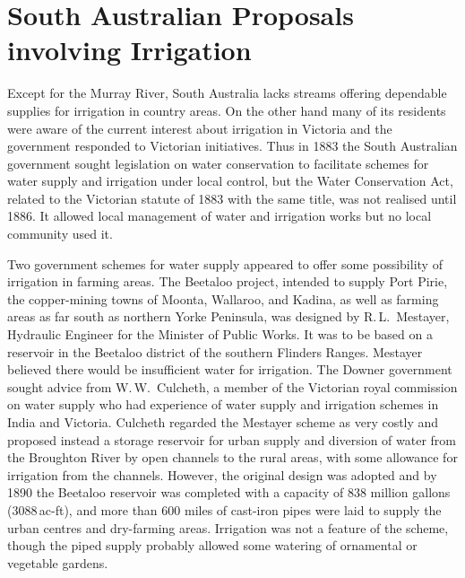 \section*{South Australian Proposals involving Irrigation}

Except for the Murray River, South Australia lacks streams offering
dependable supplies for irrigation in country areas.  On the other
hand many of its residents were aware of the current interest about
irrigation in Victoria and the government responded to Victorian
initiatives.  Thus in 1883 the South Australian government sought
legislation on water conservation to facilitate schemes for water
supply and irrigation under local control, but the Water Conservation
Act,  related to the Victorian
statute of 1883 with the same title, was not realised until 1886.  It
allowed local management of water and irrigation works but no local
community used it.

Two government schemes for water supply appeared to offer some
possibility of irrigation in farming areas.  The Beetaloo project,
intended to supply Port Pirie,  the copper-mining
towns of Moonta,  Wallaroo,  and Kadina,
 as well as farming areas as far south as northern Yorke
Peninsula,  was designed by
R.\,L.~Mestayer,  Hydraulic Engineer for the
Minister of Public Works.  It was to be based on a reservoir in the
Beetaloo  district of the southern Flinders Ranges.
Mestayer believed there would be insufficient water for irrigation.
The Downer government sought advice from W.\,W.~Culcheth,
 a member of
the Victorian royal commission on water supply who had experience of
water supply and irrigation schemes in India and Victoria.  Culcheth
regarded the Mestayer scheme as very costly and proposed instead a
storage reservoir for urban supply and diversion of water from the
Broughton River  by open channels to the rural
areas, with some allowance for irrigation from the channels.  However,
the original design was adopted and by 1890 the Beetaloo reservoir was
completed with a capacity of 838 million gallons (3088\,ac-ft), and
more than 600 miles of cast-iron pipes were laid to supply the urban
centres and dry-farming areas.  Irrigation was not a feature of the
scheme, though the piped supply probably allowed some watering of
ornamental or vegetable gardens.

